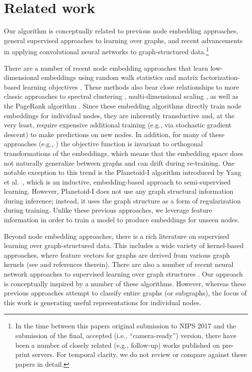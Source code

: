 
\section{Related work}

Our algorithm is conceptually related to previous node embedding approaches, general supervised approaches to learning over graphs, and recent advancements in applying convolutional neural networks to graph-structured data.\footnote{In the time between this papers original submission to NIPS 2017 and the submission of the final, accepted (i.e., ``camera-ready'') version, there have been a number of closely related (e.g., follow-up) works published on pre-print servers. For temporal clarity, we do not review or compare against these papers in detail.}

There are a number of recent node embedding approaches that learn low-dimensional embeddings using random walk statistics and matrix factorization-based learning objectives \cite{cao2015grarep,grover2016node2vec,perozzi2014deepwalk,tang2015line,wang2016structural}.
These methods also bear close relationships to more classic approaches to spectral clustering \cite{ng2001spectral}, multi-dimensional scaling \cite{kruskal1964multidimensional}, as well as the PageRank algorithm \cite{page1999pagerank}. 
Since these embedding algorithms directly train node embeddings for individual nodes, they are inherently transductive and, at the very least, require expensive additional training (e.g., via stochastic gradient descent) to make predictions on new nodes.
In addition, for many of these approaches (e.g., \cite{grover2016node2vec,perozzi2014deepwalk,tang2015line,wang2016structural}) the objective function is invariant to orthogonal transformations of the embeddings, which means that the embedding space does not naturally generalize between graphs and can drift during re-training.
One notable exception to this trend is the Planetoid-I algorithm introduced by Yang et al.\ \cite{yang2016revisiting}, which is an inductive, embedding-based approach to semi-supervised learning.
However, Planetoid-I does not use any graph structural information during inference; instead, it uses the graph structure as a form of regularization during training.
Unlike these previous approaches, we leverage feature information in order to train a model to produce embeddings for unseen nodes. 

Beyond node embedding approaches, there is a rich literature on supervised learning over graph-structured data. 
This includes a wide variety of kernel-based approaches, where feature vectors for graphs are derived from various graph kernels (see \cite{shervashidze2011weisfeiler} and references therein). 
There are also a number of recent neural network approaches to supervised learning over graph structures \cite{dai2016discriminative,gori2005new,li2015gated,scarselli2009graph}.
Our approach is conceptually inspired by a number of these algorithms.
However, whereas these previous approaches attempt to classify entire graphs (or subgraphs), the focus of this work is generating useful representations for individual nodes. 

